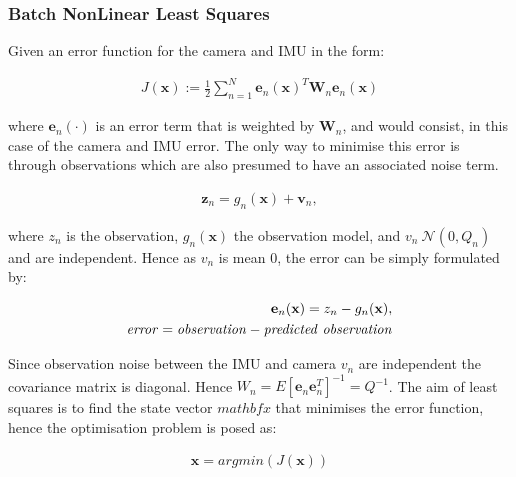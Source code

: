 \documentclass[11pt,twoside]{report}
\begin{document}
\subsubsection{Batch NonLinear Least Squares}

Given an error function for the camera and IMU in the form:

\begin{equation}
\begin{aligned}
J(\mathbf{x}) := \frac{1}{2} \sum_{n=1}^{N} \textbf{e}_{n} (\textbf{x})^{T} \textbf{W}_{n} \textbf{e}_{n}(\textbf{x}) 
\end{aligned}
\end{equation} 

where $\textbf{e}_{n}(\cdot)$ is an error term that is weighted by $\textbf{W}_{n}$, and would consist, in this case of the camera and IMU error. The only way to minimise this error is through observations which are also presumed to have an associated noise term.

\begin{equation}
\begin{aligned}
\textbf{z}_{n} = g_{n}(\textbf{x}) + \textbf{v}_{n},
\end{aligned}
\end{equation} 

where $z_{n}$ is the observation, $g_{n}(\textbf{x})$ the observation model, and $v_{n} ~ \mathcal{N}(0,Q_{n})$ and are independent. Hence as $v_{n}$ is mean 0, the error can be simply formulated by:

\begin{equation}
\begin{aligned}
\textbf{e}_{n}(\textbf{x}) = z_{n} - g_{n}(\textbf{x}), \\
\mathit{error = observation - predicted \textnormal{ } observation}
\end{aligned}
\end{equation}

Since observation noise between the IMU and camera $v_{n}$ are independent the covariance matrix is diagonal. Hence $W_{n} = E[\mathbf{e}_{n} \mathbf{e}_{n}^{T}]^{-1} = Q^{-1}$. The aim of least squares is to find the state vector $mathbf{x}$ that minimises the error function, hence the optimisation problem is posed as:

\begin{equation}
\begin{aligned}
\textbf{x} = argmin(J(\mathbf{x}))
\end{aligned}
\end{equation}
\end{document}
